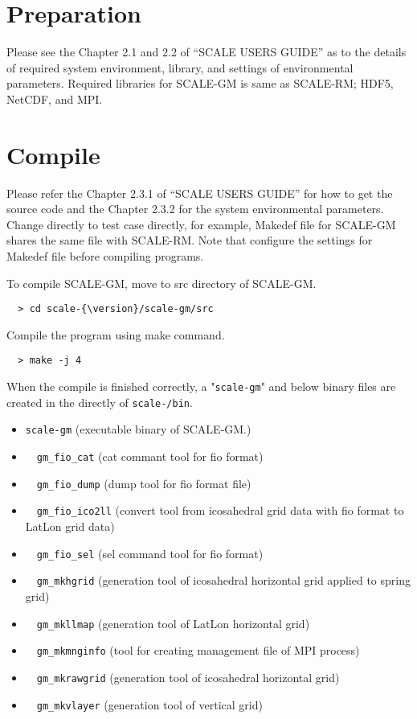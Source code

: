 

\section{Preparation}
Please see the Chapter 2.1 and 2.2 of ``SCALE USERS GUIDE''
as to the details of required system environment, library, and settings of environmental parameters.
Required libraries for SCALE-GM is same as SCALE-RM; HDF5, NetCDF, and MPI.

\section{Compile}
Please refer the Chapter 2.3.1 of ``SCALE USERS GUIDE'' for how to get the source code
and the Chapter 2.3.2 for the system environmental parameters.
Change directly to test case directly, for example,
Makedef file for SCALE-GM shares the same file with SCALE-RM.
Note that configure the settings for Makedef file before compiling programs.


\noindent To compile SCALE-GM, move to src directory of SCALE-GM.

\begin{verbatim}
  > cd scale-{\version}/scale-gm/src
\end{verbatim}

\noindent Compile the program using make command.
\begin{verbatim}
  > make -j 4
\end{verbatim}
When the compile is finished correctly,
a "\verb|scale-gm|" and below binary files are created in the directly of \texttt{scale-{\version}/bin}.
 \begin{itemize}
   \item \verb|scale-gm| (executable binary of SCALE-GM.)
   \item　\verb|gm_fio_cat| (cat commant tool for fio format)
   \item　\verb|gm_fio_dump| (dump tool for fio format file)
   \item　\verb|gm_fio_ico2ll| (convert tool from icosahedral grid data with fio format to LatLon grid data)
   \item　\verb|gm_fio_sel| (sel command tool for fio format)
   \item　\verb|gm_mkhgrid| (generation tool of icosahedral horizontal grid applied to spring grid)
   \item　\verb|gm_mkllmap| (generation tool of LatLon horizontal grid)
   \item　\verb|gm_mkmnginfo| (tool for creating management file of MPI process)
   \item　\verb|gm_mkrawgrid| (generation tool of icosahedral horizontal grid)
   \item　\verb|gm_mkvlayer| (generation tool of vertical grid)
 \end{itemize}


